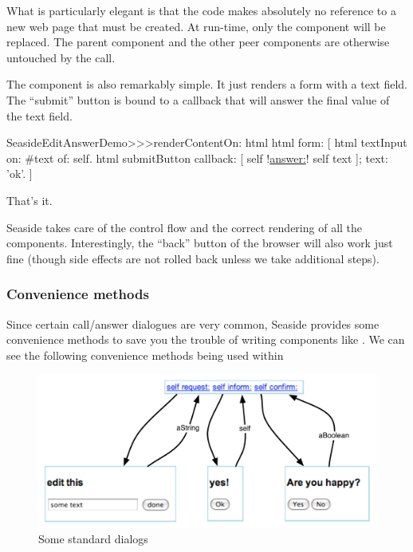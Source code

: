 \documentclass[a4paper,10pt,twoside]{book}
\begin{document}
What is particularly elegant is that the code makes absolutely no reference to a new web page that must be created.
At run-time, only the  component will be replaced.
The parent component and the other peer components are otherwise untouched by the call.

The  component is also remarkably simple.
It just renders a form with a text field.
The ``submit'' button is bound to a callback that will answer the final value of the text field.

\begin{code}{}
SeasideEditAnswerDemo>>>renderContentOn: html
	html form: [
		html textInput
			on: #text of: self.
		html submitButton
			callback: [ self !\underline{answer:}! self text ];
			text: 'ok'.
		]
\end{code}{}

That's it.

Seaside takes care of the control flow and the correct rendering of all the components.
Interestingly, the ``back'' button of the browser will also work just fine (though side effects are not rolled back unless we take additional steps).

\subsubsection{Convenience methods}

Since certain call/answer dialogues are very common, Seaside provides some convenience methods to save you the trouble of writing components like .
We can see the following convenience methods being used within 

\begin{figure}[ht]
\begin{center}
\includegraphics[width=\textwidth]{dialogs}
\caption{Some standard dialogs}
\label{fig:dialogs}
\end{center}
\end{figure}
\end{document}
